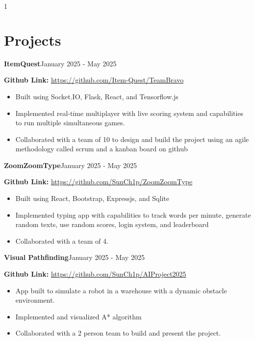 \documentclass[11pt]{article}
\newcommand{\project}[4]{
    \noindent \textbf{#1}\normalsize \hfill #2
    \par
    \noindent #3
    #4
}
\begin{document}
\begin{spacing}{1}
        \section*{\Large \textbf{Projects}}
        \normalsize
        \project{ItemQuest}{January 2025 - May 2025}{\textbf{Github Link:} \url{https://github.com/Item-Quest/TeamBravo}}
        {
            \begin{itemize}
                \setlength\itemsep{0.01em}
                \item Built using Socket.IO, Flask, React, and Tensorflow.js \par
                \item Implemented real-time multiplayer with live scoring system and capabilities to run multiple simultaneous games. \par
                \item Collaborated with a team of 10 to design and build the project using an agile methodology called scrum and a kanban board on github
            \end{itemize}
            \par
        }
        \project{ZoomZoomType}{January 2025 - May 2025}{\textbf{Github Link:} \url{https://github.com/SunCh1p/ZoomZoomType}}
        {
            \begin{itemize}
                \setlength\itemsep{0.01em}
                \item Built using React, Bootstrap, Expressjs, and Sqlite \par
                \item Implemented typing app with capabilities to track words per minute, generate random texts, use random scores, login system, and leaderboard  \par
                \item Collaborated with a team of 4.
            \end{itemize}
            \par
        }
        \project{Visual Pathfinding}{January 2025 - May 2025}{\textbf{Github Link:} \url{https://github.com/SunCh1p/AIProject2025}}
        {
            \begin{itemize}
                \setlength\itemsep{0.01em}
                \item App built to simulate a robot in a warehouse with a dynamic obstacle environment.
                \item Implemented and visualized A* algorithm  \par
                \item Collaborated with a 2 person team to build and present the project.

\end{itemize}}
\end{spacing}
\end{document}
